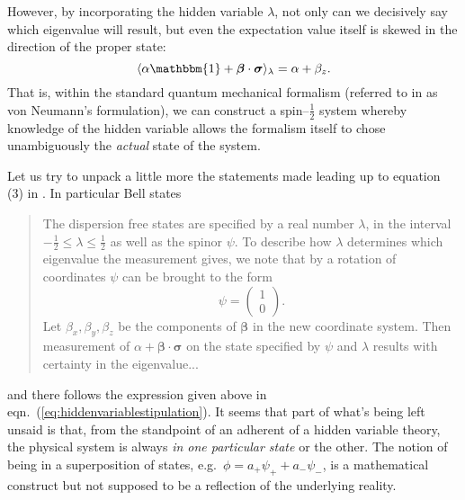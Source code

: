 \documentclass[12pt]{article}
\begin{document}
However, by incorporating the hidden variable $\lambda$, not only can we decisively say which eigenvalue will result, but even the expectation value itself is skewed in the direction of the proper state:
\begin{displaymath}
  \langle \alpha \mathbbm{1} + \bm{\beta} \cdot \bm{\sigma} \rangle_{\lambda} = \alpha + \beta_z.
\end{displaymath}
That is, within the standard quantum mechanical formalism (referred to in \cite{Bell1966} as von Neumann's formulation), we can construct a spin--$\frac{1}{2}$ system whereby knowledge of the hidden variable allows the formalism itself to chose unambiguously the \emph{actual} state of the system.

Let us try to unpack a little more the statements made leading up to equation (3) in \cite[p.448]{Bell1966}.  In particular Bell states
\begin{quotation}
  \begin{small}
    The dispersion free states are specified by a real number $\lambda$, in the interval $-\frac{1}{2} \le \lambda \le \frac{1}{2}$ as well as the spinor $\psi$. To describe how $\lambda$ determines which eigenvalue the measurement gives, we note that by a rotation of coordinates $\psi$ can be brought to the form
    \begin{displaymath}
      \psi =
      \begin{pmatrix}
        1 \\
        0
      \end{pmatrix}.
    \end{displaymath}
    Let $\beta_x, \beta_y, \beta_z$ be the components of $\bm{\beta}$ in the new coordinate system. Then measurement of $\alpha + \bm{\beta} \cdot \bm{\sigma}$ on the state specified by $\psi$ and $\lambda$ results with certainty in the eigenvalue...
  \end{small}
\end{quotation}
and there follows the expression given above in eqn.~(\ref{eq:hiddenvariablestipulation}).  It seems that part of what's being left unsaid is that, from the standpoint of an adherent of a hidden variable theory, the physical system is always \emph{in one particular state} or the other.  The notion of being in a superposition of states, e.g.\ $\phi = a_{+} \psi_{+} + a_{-} \psi_{-}$, is a mathematical construct but not supposed to be a reflection of the underlying reality.
\end{document}
